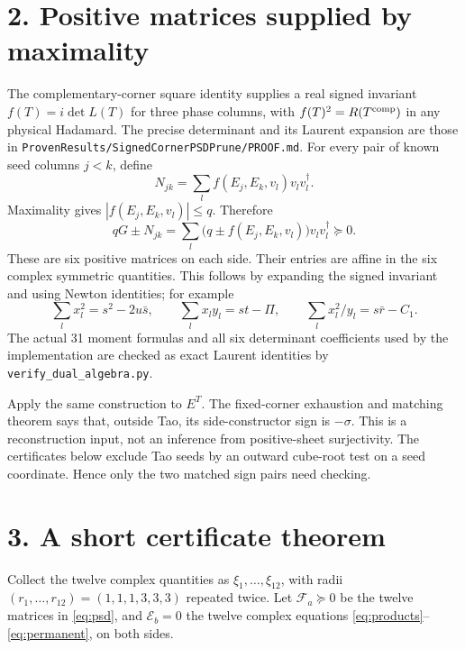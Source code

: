 \documentclass[11pt]{article}
\begin{document}
\section*{2. Positive matrices supplied by maximality}
The complementary-corner square identity supplies a real signed
invariant $f(T)=i\det L(T)$ for three phase columns, with
$f(T)^2=R(T^{\rm comp})$ in any physical Hadamard. The precise
determinant and its Laurent expansion are those in
\texttt{ProvenResults/SignedCornerPSDPrune/PROOF.md}.
For every pair of known seed columns $j<k$, define
\[
 N_{jk}=\sum_l f(E_j,E_k,v_l)v_lv_l^\dagger.
\]
Maximality gives $|f(E_j,E_k,v_l)|\le q$. Therefore
\begin{equation}\label{eq:psd}
 qG\pm N_{jk}
 =\sum_l\bigl(q\pm f(E_j,E_k,v_l)\bigr)v_lv_l^\dagger\succeq0.
\end{equation}
These are six positive matrices on each side. Their entries are affine
in the six complex symmetric quantities. This follows by expanding
the signed invariant and using Newton identities; for example
\[
 \sum_lx_l^2=s^2-2u\bar s,\qquad
 \sum_lx_ly_l=st-\Pi,\qquad
 \sum_lx_l^2/y_l=s\bar r-C_1.
\]
The actual 31 moment formulas and all six determinant coefficients
used by the implementation are checked as exact Laurent identities
by \texttt{verify\_dual\_algebra.py}.

Apply the same construction to $E^T$. The fixed-corner exhaustion and
matching theorem says that, outside Tao, its side-constructor sign is
$-\sigma$. This is a reconstruction input, not an inference from
positive-sheet surjectivity. The certificates below exclude Tao seeds
by an outward cube-root test on a seed coordinate. Hence only the two
matched sign pairs need checking.

\section*{3. A short certificate theorem}
Collect the twelve complex quantities as $\xi_1,\ldots,\xi_{12}$,
with radii $(r_1,\ldots,r_{12})=(1,1,1,3,3,3)$ repeated twice.
Let $\mathcal F_a\succeq0$ be the twelve matrices in
\eqref{eq:psd}, and $\mathcal E_b=0$ the twelve complex equations
\eqref{eq:products}--\eqref{eq:permanent}, on both sides.
\end{document}

